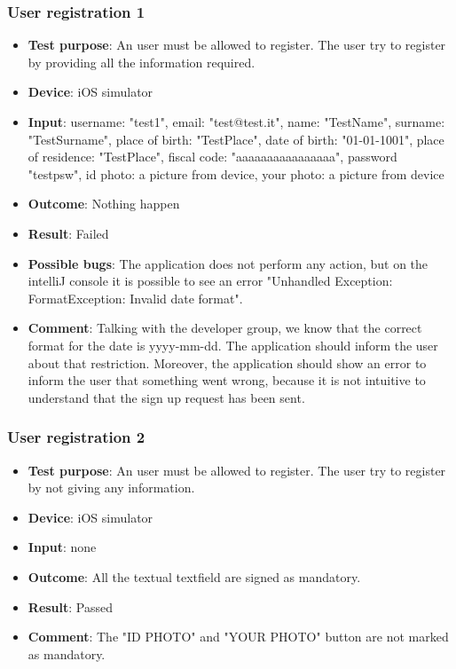 \documentclass[../ATD.tex]{subfiles}
\begin{document}
    \subsubsection{User registration 1}\label{subsubsec:user-registration-1}
    \begin{itemize}
        \item \textbf{Test purpose}: An user must be allowed to register.
        The user try to register by providing all the information required.
        \item \textbf{Device}: iOS simulator
        \item \textbf{Input}: username: "test1", email: "test@test.it", name: "TestName", surname: "TestSurname", place of birth: "TestPlace", date of birth: "01-01-1001", place of residence: "TestPlace", fiscal code: "aaaaaaaaaaaaaaaa", password "testpsw", id photo: a picture from device, your photo: a picture from device
        \item \textbf{Outcome}: Nothing happen
        \item \textbf{Result}: Failed
        \item \textbf{Possible bugs}: The application does not perform any action, but on the intelliJ console it is possible to see an error "Unhandled Exception: FormatException: Invalid date format".
        \item \textbf{Comment}: Talking with the developer group, we know that the correct format for the date is yyyy-mm-dd.
        The application should inform the user about that restriction.
        Moreover, the application should show an error to inform the user that something went wrong, because it is not intuitive to understand that the sign up request has been sent.
    \end{itemize}

    \subsubsection{User registration 2}\label{subsubsec:user-registration-2}
    \begin{itemize}
        \item \textbf{Test purpose}: An user must be allowed to register.
        The user try to register by not giving any information.
        \item \textbf{Device}: iOS simulator
        \item \textbf{Input}: none
        \item \textbf{Outcome}: All the textual textfield are signed as mandatory.
        \item \textbf{Result}: Passed
        \item \textbf{Comment}: The "ID PHOTO" and "YOUR PHOTO" button are not marked as mandatory.
    \end{itemize}
\end{document}

